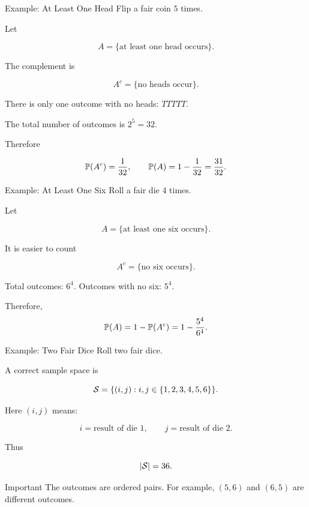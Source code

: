 \begin{frame}{Example: At Least One Head}
Flip a fair coin $5$ times.

Let

\[
A = \{\text{at least one head occurs}\}.
\]

The complement is

\[
A^c = \{\text{no heads occur}\}.
\]

There is only one outcome with no heads: $TTTTT.$

The total number of outcomes is $2^5 = 32.$

Therefore

\[
\mathbb{P}(A^c)=\frac{1}{32},
\qquad
\mathbb{P}(A)=1-\frac{1}{32}=\frac{31}{32}.
\]
\end{frame}

\begin{frame}{Example: At Least One Six}
Roll a fair die $4$ times.

Let

\[
A = \{\text{at least one six occurs}\}.
\]

It is easier to count

\[
A^c = \{\text{no six occurs}\}.
\]

Total outcomes: $6^4$. Outcomes with no six: $5^4$.

Therefore,
\[
\mathbb{P}(A)
=
1-\mathbb{P}(A^c)
=
1-\frac{5^4}{6^4}.
\]
\end{frame}




\begin{frame}{Example: Two Fair Dice}
Roll two fair dice.

A correct sample space is

\[
\mathcal{S} = \{(i,j): i,j \in \{1,2,3,4,5,6\}\}.
\]

Here $(i,j)$ means:

\[
i = \text{result of die 1},
\qquad
j = \text{result of die 2}.
\]

Thus

\[
|\mathcal{S}| = 36.
\]

\vspace{0.25cm}

\begin{keybox}{Important}
The outcomes are ordered pairs.  
For example, $(5,6)$ and $(6,5)$ are different outcomes.
\end{keybox}
\end{frame}


